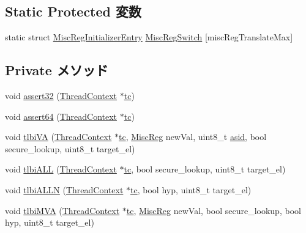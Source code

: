 \subsection*{Static Protected 変数}
\begin{DoxyCompactItemize}
\item 
static struct \hyperlink{structArmISA_1_1ISA_1_1MiscRegInitializerEntry}{MiscRegInitializerEntry} \hyperlink{structArmISA_1_1ISA_af82c294831fc5f1bce99f03cacdd8884}{MiscRegSwitch} \mbox{[}miscRegTranslateMax\mbox{]}
\end{DoxyCompactItemize}
\subsection*{Private メソッド}
\begin{DoxyCompactItemize}
\item 
void \hyperlink{structArmISA_1_1ISA_aa4f7032f366383d3b3696a1d0f5410a2}{assert32} (\hyperlink{classThreadContext}{ThreadContext} $\ast$\hyperlink{namespaceArmISA_a5aff829af55e65b802d83dfcef4e9dd0}{tc})
\item 
void \hyperlink{structArmISA_1_1ISA_aad0b8ae6c31a34244ccf43b9202b40eb}{assert64} (\hyperlink{classThreadContext}{ThreadContext} $\ast$\hyperlink{namespaceArmISA_a5aff829af55e65b802d83dfcef4e9dd0}{tc})
\item 
void \hyperlink{structArmISA_1_1ISA_ac79ec0e36bd10b6ae9a109def0b71fb2}{tlbiVA} (\hyperlink{classThreadContext}{ThreadContext} $\ast$\hyperlink{namespaceArmISA_a5aff829af55e65b802d83dfcef4e9dd0}{tc}, \hyperlink{namespaceArmISA_aa16539aa6584fd12f7d6fa868f75b4de}{MiscReg} newVal, uint8\_\-t \hyperlink{namespaceArmISA_a92720268bdaf1e0e53fc66152af0ff18}{asid}, bool secure\_\-lookup, uint8\_\-t target\_\-el)
\item 
void \hyperlink{structArmISA_1_1ISA_a06e97933d5648bf0558da52b060bd815}{tlbiALL} (\hyperlink{classThreadContext}{ThreadContext} $\ast$\hyperlink{namespaceArmISA_a5aff829af55e65b802d83dfcef4e9dd0}{tc}, bool secure\_\-lookup, uint8\_\-t target\_\-el)
\item 
void \hyperlink{structArmISA_1_1ISA_a6ea364a473aab7a0fd9d7f4f68bff214}{tlbiALLN} (\hyperlink{classThreadContext}{ThreadContext} $\ast$\hyperlink{namespaceArmISA_a5aff829af55e65b802d83dfcef4e9dd0}{tc}, bool hyp, uint8\_\-t target\_\-el)
\item 
void \hyperlink{structArmISA_1_1ISA_af079c2af6d92761ccb2f8083884479a7}{tlbiMVA} (\hyperlink{classThreadContext}{ThreadContext} $\ast$\hyperlink{namespaceArmISA_a5aff829af55e65b802d83dfcef4e9dd0}{tc}, \hyperlink{namespaceArmISA_aa16539aa6584fd12f7d6fa868f75b4de}{MiscReg} newVal, bool secure\_\-lookup, bool hyp, uint8\_\-t target\_\-el)
\end{DoxyCompactItemize}


